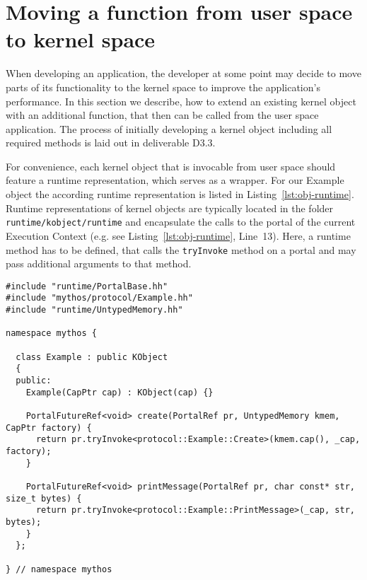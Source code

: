 \section{Moving a function from user space to kernel space}

When developing an application, the developer at some point may decide to move
parts of its functionality to the kernel space to improve the application's
performance. In this section we describe, how to extend an existing kernel
object with an additional function, that then can be called from the user space
application. The process of initially developing a kernel object including all
required methods is laid out in deliverable D3.3.

For convenience, each kernel object that is invocable from user space should
feature a runtime representation, which serves as a wrapper.  For our Example
object the according runtime representation is listed in
Listing~\ref{lst:obj-runtime}. Runtime representations of kernel objects are
typically located in the folder \texttt{runtime/kobject/runtime} and
encapsulate the calls to the portal of the current Execution Context (e.g. see
Listing~\ref{lst:obj-runtime}, Line~13). Here, a runtime method has to be
defined, that calls the \texttt{tryInvoke} method on a portal and may pass
additional arguments to that method.

\lstset{language=c++,caption=Object's Runtime Representation,label=lst:obj-runtime}
\begin{lstlisting}
#include "runtime/PortalBase.hh"
#include "mythos/protocol/Example.hh"
#include "runtime/UntypedMemory.hh"

namespace mythos {

  class Example : public KObject
  {
  public:
    Example(CapPtr cap) : KObject(cap) {}

    PortalFutureRef<void> create(PortalRef pr, UntypedMemory kmem, CapPtr factory) {
      return pr.tryInvoke<protocol::Example::Create>(kmem.cap(), _cap, factory);
    }

    PortalFutureRef<void> printMessage(PortalRef pr, char const* str, size_t bytes) {
      return pr.tryInvoke<protocol::Example::PrintMessage>(_cap, str, bytes);
    }
  };

} // namespace mythos
\end{lstlisting}

